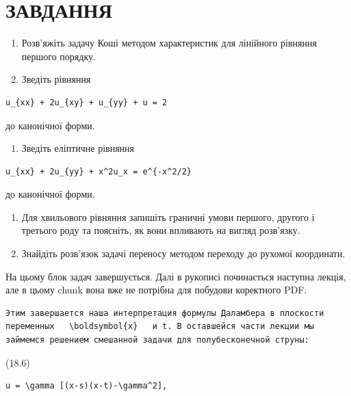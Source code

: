\documentclass[
  ukrainian,
]{article}
\providecommand{\tightlist}{%
  \setlength{\itemsep}{0pt}\setlength{\parskip}{0pt}}
\begin{document}
\section{ЗАВДАННЯ}\label{ux437ux430ux432ux434ux430ux43dux43dux44f-3}

\begin{enumerate}
\def\labelenumi{\arabic{enumi}.}
\item
  Розв'яжіть задачу Коші методом характеристик для лінійного рівняння
  першого порядку.
\item
  Зведіть рівняння
\end{enumerate}

\begin{verbatim}
u_{xx} + 2u_{xy} + u_{yy} + u = 2
\end{verbatim}

до канонічної форми.

\begin{enumerate}
\def\labelenumi{\arabic{enumi}.}
\setcounter{enumi}{2}
\tightlist
\item
  Зведіть еліптичне рівняння
\end{enumerate}

\begin{verbatim}
u_{xx} + 2u_{yy} + x^2u_x = e^{-x^2/2}
\end{verbatim}

до канонічної форми.

\begin{enumerate}
\def\labelenumi{\arabic{enumi}.}
\setcounter{enumi}{3}
\item
  Для хвильового рівняння запишіть граничні умови першого, другого і
  третього роду та поясніть, як вони впливають на вигляд розв'язку.
\item
  Знайдіть розв'язок задачі переносу методом переходу до рухомої
  координати.
\end{enumerate}

На цьому блок задач завершується. Далі в рукописі починається наступна
лекція, але в цьому chunk вона вже не потрібна для побудови коректного
PDF.

\begin{verbatim}
Этим завершается наша интерпретация формулы Даламбера в плоскости переменных   \boldsymbol{x}   и t. В оставшейся части лекции мы займемся решением смешанной задачи для полубесконечной струны:
\end{verbatim}

(18.6)

\begin{verbatim}
u = \gamma [(x-s)(x-t)-\gamma^2],
\end{verbatim}
\end{document}
